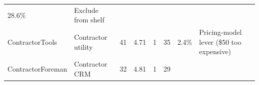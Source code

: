\documentclass[
  10pt,
]{article}
\begin{document}
\begin{longtable}[]{@{}llllllll@{}}
\begin{minipage}[t]{0.10\columnwidth}
28.6\%\strut
\end{minipage} & \begin{minipage}[t]{0.10\columnwidth}\raggedright
Exclude from shelf\strut
\end{minipage}\tabularnewline
\begin{minipage}[t]{0.10\columnwidth}\raggedright
ContractorTools\strut
\end{minipage} & \begin{minipage}[t]{0.10\columnwidth}\raggedright
Contractor utility\strut
\end{minipage} & \begin{minipage}[t]{0.10\columnwidth}\raggedright
41\strut
\end{minipage} & \begin{minipage}[t]{0.10\columnwidth}\raggedright
4.71\strut
\end{minipage} & \begin{minipage}[t]{0.10\columnwidth}\raggedright
1\strut
\end{minipage} & \begin{minipage}[t]{0.10\columnwidth}\raggedright
35\strut
\end{minipage} & \begin{minipage}[t]{0.10\columnwidth}\raggedright
2.4\%\strut
\end{minipage} & \begin{minipage}[t]{0.10\columnwidth}\raggedright
Pricing-model lever (\$50 too expensive)\strut
\end{minipage}\tabularnewline
\begin{minipage}[t]{0.10\columnwidth}\raggedright
ContractorForeman\strut
\end{minipage} & \begin{minipage}[t]{0.10\columnwidth}\raggedright
Contractor CRM\strut
\end{minipage} & \begin{minipage}[t]{0.10\columnwidth}\raggedright
32\strut
\end{minipage} & \begin{minipage}[t]{0.10\columnwidth}\raggedright
4.81\strut
\end{minipage} & \begin{minipage}[t]{0.10\columnwidth}\raggedright
1\strut
\end{minipage} & \begin{minipage}[t]{0.10\columnwidth}\raggedright
29\strut
\end{minipage} & \begin{minipage}[t]{0.10\columnwidth}\raggedright

\end{minipage}
\end{longtable}
\end{document}
